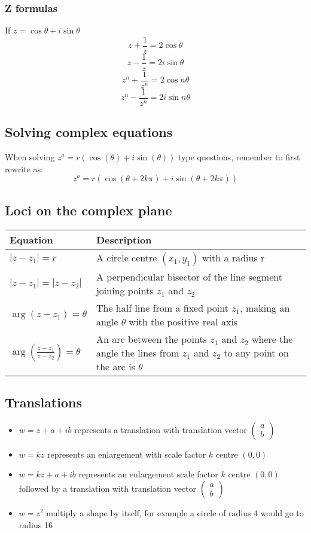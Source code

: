 \documentclass{article}[18pt]
\begin{document}
\subsubsection{Z formulas}
If $z=\cos\theta+i\sin\theta$
$$z+\frac{1}{z}=2\cos\theta$$
$$z-\frac{1}{z}=2i\sin\theta$$
$$z^n+\frac{1}{z^n}=2\cos n\theta$$
$$z^n-\frac{1}{z^n}=2i\sin n\theta$$
\subsection{Solving complex equations}
When solving $z^a=r(\cos(\theta)+i\sin(\theta))$ type questions, remember to first rewrite as:
$$z^a=r(\cos(\theta+2k\pi)+i\sin(\theta+2k\pi))$$


\subsection{Loci on the complex plane}
\begin{tabularx}{\textwidth}{|X|X|}
\hline
Equation&Description\\
\hline
{\Large$|z-z_1|=r$}&A circle centre $(x_1,y_1)$ with a radius r\\
\hline
{\Large$|z-z_1|=|z-z_2|$}&A perpendicular bisector of the line segment joining points $z_1$ and $z_2$\\
\hline
{\Large$\arg(z-z_1)=\theta$}&The half line from a fixed point $z_1$, making an angle $\theta$ with the positive real axis\\
\hline
{\Large$\arg(\frac{z-z_1}{z-z_2})=\theta$}&An arc between the points $z_1$ and $z_2$ where the angle the lines from $z_1$ and $z_2$ to any point on the arc is $\theta$\\
\hline
\end{tabularx}
\subsection{Translations}
\begin{itemize}
\item $w=z+a+ib$ represents a translation with translation vector $\begin{pmatrix}
a\\b
\end{pmatrix}$
\item $w=kz$ represents an enlargement with scale factor $k$ centre $(0,0)$
\item $w=kz+a+ib$ represents an enlargement scale factor $k$ centre $(0,0)$ followed by a translation with translation vector $\begin{pmatrix}
a\\b
\end{pmatrix}$
\item $w=z^2$ multiply a shape by itself, for example a circle of radius 4 would go to radius 16
\end{itemize}
\end{document}
